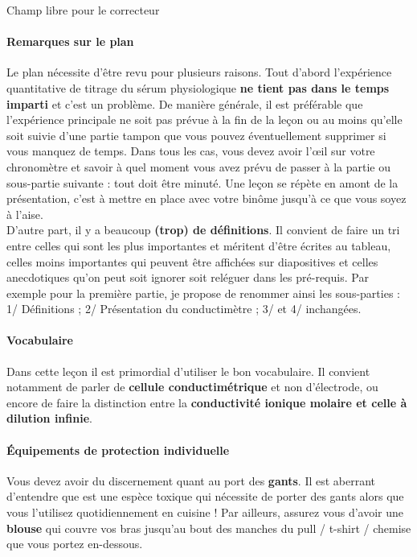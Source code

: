 \begin{reportBlock}{Champ libre pour le correcteur}

\paragraph*{Remarques sur le plan}
Le plan nécessite d'être revu pour plusieurs raisons. Tout d'abord l'expérience quantitative de titrage du sérum physiologique \textbf{ne tient pas dans le temps imparti} et c'est un problème. De manière générale, il est préférable que l'expérience principale ne soit pas prévue à la fin de la leçon ou au moins qu'elle soit suivie d'une partie tampon que vous pouvez éventuellement supprimer si vous manquez de temps. Dans tous les cas, vous devez avoir l'œil sur votre chronomètre et savoir à quel moment vous avez prévu de passer à la partie ou sous-partie suivante : tout doit être minuté. Une leçon se répète en amont de la présentation, c'est à mettre en place avec votre binôme jusqu'à ce que vous soyez à l'aise.\\

D'autre part, il y a beaucoup \textbf{(trop) de définitions}. Il convient de faire un tri entre celles qui sont les plus importantes et méritent d'être écrites au tableau, celles moins importantes qui peuvent être affichées sur diapositives et celles anecdotiques qu'on peut soit ignorer soit reléguer dans les pré-requis. Par exemple pour la première partie, je propose de renommer ainsi les sous-parties : 1/ Définitions ; 2/ Présentation du conductimètre ; 3/ et 4/ inchangées.\\

\paragraph*{Vocabulaire}
Dans cette leçon il est primordial d'utiliser le bon vocabulaire. Il convient notamment de parler de \textbf{cellule conductimétrique} et non d'électrode, ou encore de faire la distinction entre la \textbf{conductivité ionique molaire et celle à dilution infinie}.\\

\paragraph*{Équipements de protection individuelle}
Vous devez avoir du discernement quant au port des \textbf{gants}. Il est aberrant d'entendre que  est une espèce toxique qui nécessite de porter des gants alors que vous l'utilisez quotidiennement en cuisine ! Par ailleurs, assurez vous d'avoir une \textbf{blouse} qui couvre vos bras jusqu'au bout des manches du pull / t-shirt / chemise que vous portez en-dessous.\\


\end{reportBlock}
